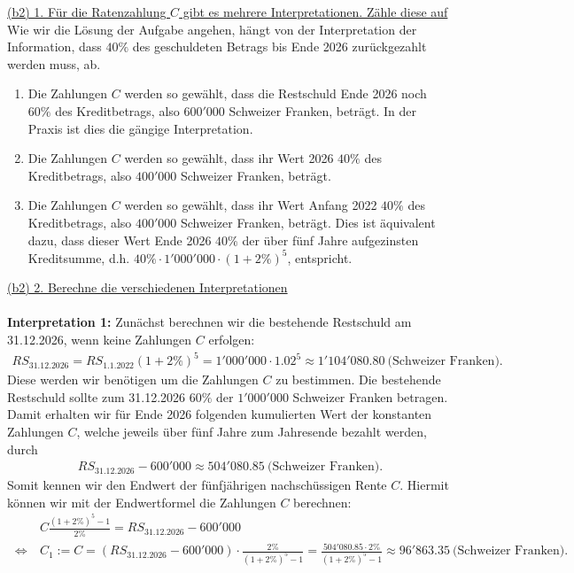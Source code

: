 \underline{(b2) 1. Für die Ratenzahlung $C$ gibt es mehrere Interpretationen. Zähle diese auf}\\
Wie wir die Lösung der Aufgabe angehen, hängt von der Interpretation der Information, dass $40 \%$ des geschuldeten Betrags bis Ende 2026 zurückgezahlt werden muss, ab.
\begin{enumerate}
	\item 
	Die Zahlungen $C$ werden so gewählt, dass die Restschuld Ende 2026 noch $60 \%$ des Kreditbetrags, also $600'000$ Schweizer Franken, beträgt.
	In der Praxis ist dies die gängige Interpretation.
	\item 
	Die Zahlungen $C$ werden so gewählt, dass ihr Wert 2026 $40 \%$ des Kreditbetrags, also $400'000$ Schweizer Franken, beträgt.
	\item 
	Die Zahlungen $C$ werden so gewählt, dass ihr Wert Anfang 2022 $40 \%$ des Kreditbetrags, also $400'000$ Schweizer Franken, beträgt.
	Dies ist äquivalent dazu, dass dieser Wert Ende 2026 $40 \%$ der über fünf Jahre aufgezinsten Kreditsumme, d.h. $40 \% \cdot 1'000'000 \cdot ( 1 + 2 \%)^5$, entspricht. 
\end{enumerate}
\newpage
\underline{(b2) 2. Berechne die verschiedenen Interpretationen}\\
\\
\textbf{Interpretation 1:}
Zunächst berechnen wir die bestehende Restschuld am 31.12.2026, wenn keine Zahlungen $C$ erfolgen:
\begin{align*}
	RS_{\mathrm{31.12.2026}}
	=
	RS_{\mathrm{1.1.2022}} ( 1+ 2 \%)^5
	=
	1 '000'000 \cdot 1.02^5 
	\approx
	1'104'080.80 \ \textrm{(Schweizer Franken)}.
\end{align*}
Diese werden wir benötigen um die Zahlungen $C$ zu bestimmen.
Die bestehende Restschuld sollte zum 31.12.2026 $60 \%$ der $1' 000 '000$ Schweizer Franken betragen.
Damit erhalten wir für Ende 2026 folgenden kumulierten Wert der konstanten Zahlungen $C$, welche jeweils über fünf Jahre zum Jahresende bezahlt werden, durch
\begin{align*}
	RS_{\mathrm{31.12.2026}}
	- 600' 000 
	\approx 
	504' 080.85
	\ \textrm{(Schweizer Franken)}.
\end{align*} 
Somit kennen wir den Endwert der fünfjährigen nachschüssigen Rente $C$. Hiermit können wir mit der Endwertformel die Zahlungen $C$ berechnen:
\begin{align*}
	&C \frac{(1+2\%)^5 -1 }{2 \%} = 	RS_{\mathrm{31.12.2026}}
	- 600' 000\\
	\ \Leftrightarrow \
	&C_1:=C 
	= (RS_{\mathrm{31.12.2026}}
	- 600' 000) \cdot \frac{2 \%}{(1+2\%)^5 -1 }
	=
	\frac{504' 080.85 \cdot 2 \%}{(1+2\%)^5 -1 }
	\approx 96' 863.35
	\ \textrm{(Schweizer Franken)}.
\end{align*}
